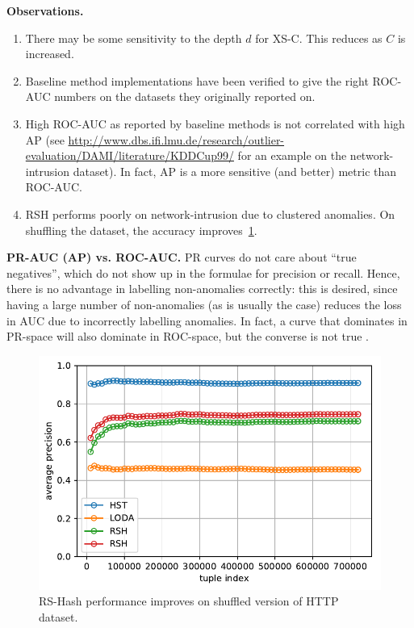 \documentclass[11pt,onecolumn]{article}
\begin{document}
\textbf{Observations.}
\begin{enumerate}
	\item There may be some sensitivity to the depth $d$ for XS-C. This reduces as $C$ is increased.
	\item Baseline method implementations have been verified to give the right ROC-AUC numbers on the datasets they originally reported on.
	\item High ROC-AUC as reported by baseline methods is not correlated with high AP (see \url{http://www.dbs.ifi.lmu.de/research/outlier-evaluation/DAMI/literature/KDDCup99/} for an example on the network-intrusion dataset). In fact, AP is a more sensitive (and better) metric than ROC-AUC.
	\item RSH performs poorly on network-intrusion due to clustered anomalies. On shuffling the dataset, the accuracy improves~\ref{fig:rsh_shuffle}.
\end{enumerate}

\textbf{PR-AUC (AP) vs. ROC-AUC.} PR curves do not care about ``true negatives'', which do not show up in the formulae for precision or recall. Hence, there is no advantage in labelling non-anomalies correctly: this is desired, since having a large number of non-anomalies (as is usually the case) reduces the loss in AUC due to incorrectly labelling anomalies. In fact, a curve that dominates in PR-space will also dominate in ROC-space, but the converse is not true \parencite{davis2006relationship}.

\begin{figure}
\centering
	\includegraphics[scale=0.6]{fig/shuffled_ap_over_time.pdf}
	\caption{RS-Hash performance improves on shuffled version of HTTP dataset.}
	\label{fig:rsh_shuffle}
\end{figure}






\printbibliography
\end{document}
